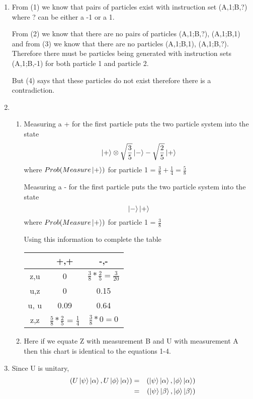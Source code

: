 \documentclass[11pt,fleqn]{article}
\begin{document}
\begin{enumerate}
\item %
From (1) we know that pairs of particles exist with instruction set (A,1;B,?) where ? can be either a -1 or a 1.

 From (2) we know that there are no pairs of particles (A,1;B,?), (A,1;B,1) and from (3) we know that there are no particles (A,1;B,1), (A,1;B,?). Therefore there must be particles being generated with instruction sets (A,1;B,-1) for both particle 1 and particle 2.

 But (4) says that these particles do not exist therefore there is a contradiction. 
\item %
\begin{enumerate}
\item 

Measuring a + for the first particle puts the two particle system into the state 
\[
\left\vert{+}\right\rangle \otimes \sqrt{\frac{3}{5}}\left\vert{-}\right\rangle-\sqrt{\frac{2}{5}}\left\vert{+}\right\rangle
\]
where $Prob(Measure \left\vert{+}\right\rangle)$ for particle 1 = $\frac{3}{8}+\frac{1}{4}=\frac{5}{8}$

Measuring a - for the first particle puts the two particle system into the state 
\[
\left\vert{-}\right\rangle\left\vert{+}\right\rangle
\]
where $Prob(Measure \left\vert{+}\right\rangle)$ for particle 1 = $\frac{3}{8}$

Using this information to complete the table

\begin{tabular}{ c c c }
 & +,+ & -,- \\
\hline
z,u & 0 & $\frac{3}{8}*\frac{2}{5} = \frac{3}{20}$\\
u,z & 0 & 0.15 \\
u, u & 0.09 & 0.64 \\
z,z & $\frac{5}{8} * \frac{2}{5}$ = $\frac{1}{4}$ & $\frac{3}{8}*0=0$\\
\hline
\end{tabular}

\item 
Here if we equate Z with measurement B and U with measurement A then this chart is identical to the equations 1-4. 

\end{enumerate}

\item %
Since U is unitary,
\begin{eqnarray}
(U\left\vert{\psi}\right\rangle\left\vert{\alpha}\right\rangle, U\left\vert{\phi}\right\rangle\left\vert{\alpha}\right\rangle) &=& (\left\vert{\psi}\right\rangle\left\vert{\alpha}\right\rangle, \left\vert{\phi}\right\rangle\left\vert{\alpha}\right\rangle) \\
&=& (\left\vert{\psi}\right\rangle\left\vert{\beta}\right\rangle, \left\vert{\phi}\right\rangle\left\vert{\beta}\right\rangle)
\end{eqnarray}


\end{enumerate}
\end{document}
